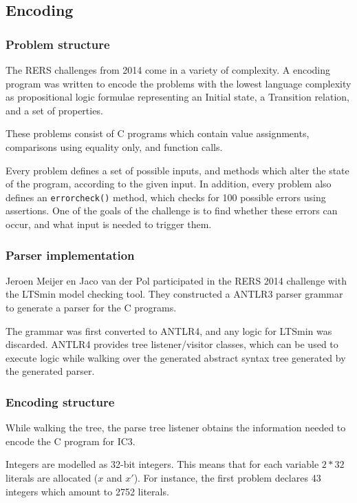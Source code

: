 \documentclass[a4paper]{article}
\begin{document}
\subsection{Encoding} %
\subsubsection{Problem structure}
The RERS challenges from 2014 come in a variety of complexity. A encoding program was written to encode the problems with the lowest language complexity as propositional logic formulae representing an Initial state, a Transition relation, and a set of properties.

These problems consist of C programs which contain value assignments, comparisons using equality only, and function calls.

Every problem defines a set of possible inputs, and methods which alter the state of the program, according to the given input.
In addition, every problem also defines an \texttt{errorcheck()} method, which checks for 100 possible errors using assertions. One of the goals of the challenge is to find whether these errors can occur, and what input is needed to trigger them.


\subsubsection{Parser implementation}
Jeroen Meijer en Jaco van der Pol participated in the RERS 2014 challenge with the LTSmin model checking tool.
They constructed a ANTLR3 parser grammar to generate a parser for the C programs.

The grammar was first converted to ANTLR4, and any logic for LTSmin was discarded.
ANTLR4 provides tree listener/visitor classes, which can be used to execute logic while walking over the generated abstract syntax tree generated by the generated parser.

\subsubsection{Encoding structure}
While walking the tree, the parse tree listener obtains the information needed to encode the C program for IC3.

Integers are modelled as 32-bit integers. This means that for each variable $2*32$ literals are allocated ($x$ and $x'$). For instance, the first problem declares 43 integers which amount to 2752 literals.
\end{document}
